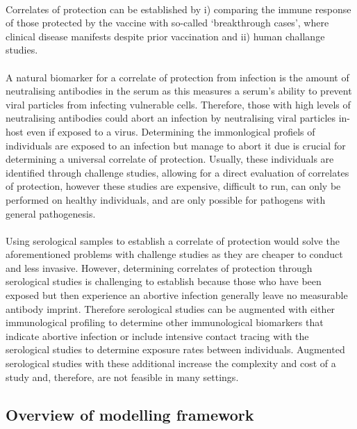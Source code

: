 \paragraph{}Correlates of protection can be established by i) comparing the immune response of those protected by the vaccine with so-called ‘breakthrough cases’, where clinical disease manifests despite prior vaccination and ii) human challange studies.\cite{} 

\paragraph{}A natural biomarker for a correlate of protection from infection is the amount of neutralising antibodies in the serum as this measures a serum's ability to prevent viral particles from infecting vulnerable cells. Therefore, those with high levels of neutralising antibodies could abort an infection by neutralising viral particles in-host even if exposed to a virus. Determining the immonlogical profiels of individuals are exposed to an infection but manage to abort it due is crucial for determining a universal correlate of protection. Usually, these individuals are identified through challenge studies, allowing for a direct evaluation of correlates of protection, however these studies are expensive, difficult to run, can only be performed on healthy individuals, and are only possible for pathogens with general pathogenesis.

\paragraph{}Using serological samples to establish a correlate of protection would solve the aforementioned problems with challenge studies as they are cheaper to conduct and less invasive. However, determining correlates of protection through serological studies is challenging to establish because those who have been exposed but then experience an abortive infection generally leave no measurable antibody imprint. Therefore serological studies can be augmented with either immunological profiling to determine other immunological biomarkers that indicate abortive infection\cite{} or include intensive contact tracing with the serological studies to determine exposure rates between individuals\cite{}. Augmented serological studies with these additional increase the complexity and cost of a study and, therefore, are not feasible in many settings.


\subsection{Overview of modelling framework}

